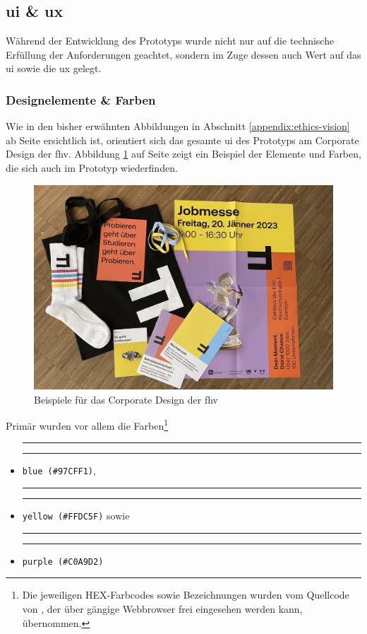 \documentclass[a4paper,12pt,twoside,numbers=noendperiod]{scrreprt}
\newcommand{\coloredSquare}[1]{%
  \textcolor{white}{\rule{1em}{1em}}%
  \textcolor[HTML]{#1}{\rule{0.8em}{0.8em}}%
}
\begin{document}
\subsection{\acl{ui} \& \acl{ux}}
\label{sub-sec:ausarbeitung-ui-ux}

Während der Entwicklung des Prototyps wurde nicht nur auf die technische Erfüllung der Anforderungen geachtet, sondern im Zuge dessen auch Wert auf das \acl{ui} sowie die \acl{ux} gelegt. 

\subsubsection*{Designelemente \& Farben}
\label{sub-sub-sec:designelemente-farben}

Wie in den bisher erwähnten Abbildungen in Abschnitt \ref{appendix:ethics-vision} ab Seite \pageref{appendix:ethics-vision} ersichtlich ist, orientiert sich das gesamte \ac{ui} des Prototyps am Corporate Design der \ac{fhv}. Abbildung \ref{fig:fhv-cd} auf Seite \pageref{fig:fhv-cd} zeigt ein Beispiel der Elemente und Farben, die sich auch im Prototyp wiederfinden.

\begin{figure}[ht]
    \centering
    \includegraphics[width=.8\linewidth]{thesis/images/FHV_Corporate-Design-Beispiel.png}
    \caption[Beispiele für das Corporate Design der \acl{fhv}]{Beispiele für das Corporate Design der \acl{fhv} \cite{fachhochschule_vorarlberg_gmbh_and_2022}}
    \label{fig:fhv-cd}
\end{figure}

Primär wurden vor allem die Farben\footnote{Die jeweiligen HEX-Farbcodes sowie Bezeichnungen wurden vom Quellcode von \cite{fachhochschule_vorarlberg_gmbh_fachhochschule_2023}, der über gängige Webbrowser frei eingesehen werden kann, übernommen.}
\begin{itemize}
    \item \coloredSquare{97cff1} \texttt{blue (\#97CFF1)},
    \item \coloredSquare{ffdc5f} \texttt{yellow (\#FFDC5F)} sowie
    \item \coloredSquare{c0a9d2} \texttt{purple (\#C0A9D2)}
\end{itemize}
\end{document}
